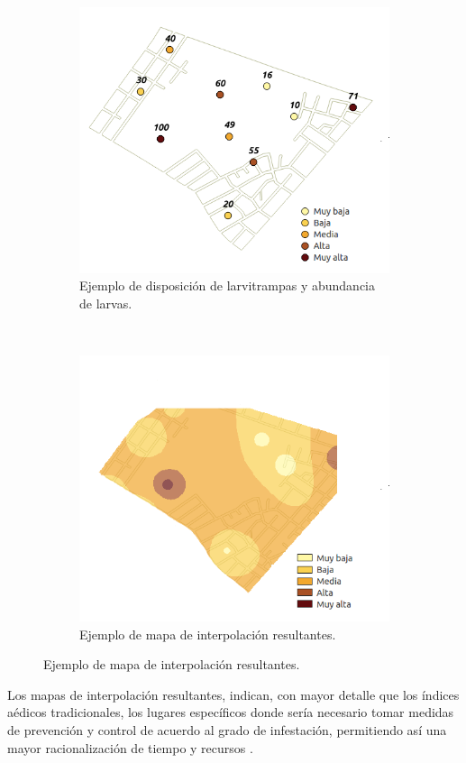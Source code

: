 \begin{figure}[!htbp]
    \centering
    \begin{subfigure}[b]{0.45\textwidth}
        \includegraphics[width=1\textwidth]{capitulo-2/graphics/distribucion-puntos-control.png}
        \caption{\label{fig:sig-distribucion-puntos-control}Ejemplo de disposición de larvitrampas y abundancia de larvas.}
    \end{subfigure}
    ~~~~
    \begin{subfigure}[b]{0.45\textwidth}
        \includegraphics[width=1\textwidth]{capitulo-2/graphics/puntos-control-interpolacion.png}
        \caption{\label{fig:sig-puntos-control-interpolacion} Ejemplo de mapa de interpolación resultantes.}
    \end{subfigure}
\end{figure}

Los mapas de interpolación resultantes, indican, con mayor detalle que los índices aédicos
tradicionales, los lugares específicos donde sería necesario tomar medidas de prevención y
control de acuerdo al grado de infestación, permitiendo así una mayor racionalización de tiempo y
recursos \cite{NINO2011}.
